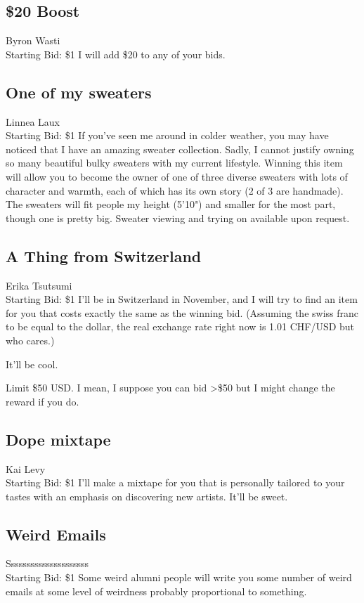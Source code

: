 \documentclass[11pt]{article}
\begin{document}
\subsection{\$20 Boost}
Byron Wasti
\\
Starting Bid: \$1
\newline
I will add \$20 to any of your bids.
\subsection{One of my sweaters}
Linnea Laux
\\
Starting Bid: \$1
\newline
If you've seen me around in colder weather, you may have noticed that I have an amazing sweater collection. Sadly, I cannot justify owning so many beautiful bulky sweaters with my current lifestyle. Winning this item will allow you to become the owner of one of three diverse sweaters with lots of character and warmth, each of which has its own story (2 of 3 are handmade). The sweaters will fit people my height (5'10") and smaller for the most part, though one is pretty big. Sweater viewing and trying on available upon request.
\subsection{A Thing from Switzerland}
Erika Tsutsumi
\\
Starting Bid: \$1
\newline
I'll be in Switzerland in November, and I will try to find an item for you that costs exactly the same as the winning bid. (Assuming the swiss franc to be equal to the dollar, the real exchange rate right now is 1.01 CHF/USD but who cares.)

It'll be cool. 

Limit \$50 USD. I mean, I suppose you can bid \textgreater \$50 but I might change the reward if you do.
\subsection{Dope mixtape}
Kai Levy
\\
Starting Bid: \$1
\newline
I'll make a mixtape for you that is personally tailored to your tastes with an emphasis on discovering new artists. It'll be sweet.
\subsection{Weird Emails}
Sssssssssssssssssssss
\\
Starting Bid: \$1
\newline
Some weird alumni people will write you some number of weird emails at some level of weirdness probably proportional to something.
\end{document}
